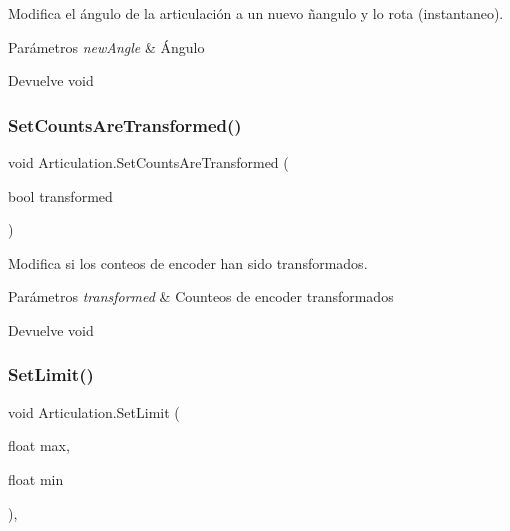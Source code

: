 Modifica el ángulo de la articulación a un nuevo ñangulo y lo rota (instantaneo). 
\begin{DoxyParams}{Parámetros}
{\em new\+Angle} & Ángulo \\
\hline
\end{DoxyParams}
\begin{DoxyReturn}{Devuelve}
void 
\end{DoxyReturn}
\mbox{\label{class_articulation_ae1b9d736b24392a46c7d53e91cbe7908}} 
\subsubsection{\texorpdfstring{SetCountsAreTransformed()}{SetCountsAreTransformed()}}
{\footnotesize\ttfamily void Articulation.\+Set\+Counts\+Are\+Transformed (\begin{DoxyParamCaption}\item[{bool}]{transformed }\end{DoxyParamCaption})\hspace{0.3cm}{\ttfamily [inline]}}

Modifica si los conteos de encoder han sido transformados. 
\begin{DoxyParams}{Parámetros}
{\em transformed} & Counteos de encoder transformados \\
\hline
\end{DoxyParams}
\begin{DoxyReturn}{Devuelve}
void 
\end{DoxyReturn}
\mbox{\label{class_articulation_ac3ed162898a61f33eb8b9e74c9e46389}} 
\subsubsection{\texorpdfstring{SetLimit()}{SetLimit()}\hspace{0.1cm}{\footnotesize\ttfamily [1/2]}}
{\footnotesize\ttfamily void Articulation.\+Set\+Limit (\begin{DoxyParamCaption}\item[{float}]{max,  }\item[{float}]{min }\end{DoxyParamCaption})\hspace{0.3cm}{\ttfamily [inline]}, {\ttfamily [private]}}

